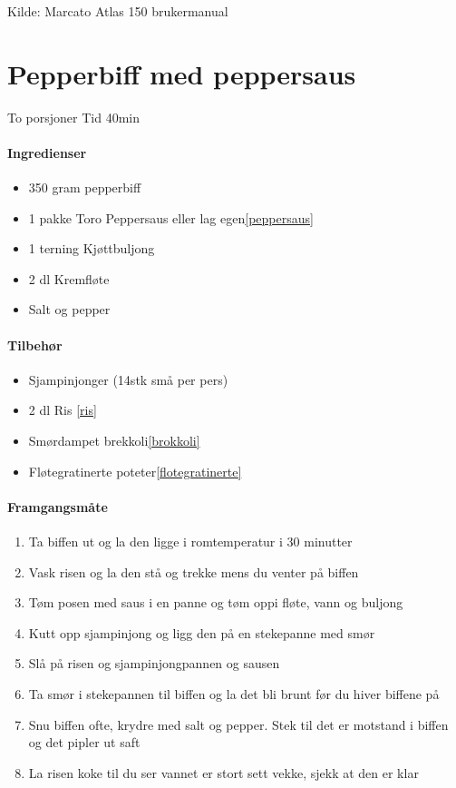 \documentclass[12pt,a4paper]{book}
\begin{document}
{Kilde: Marcato Atlas 150 brukermanual
\clearpage{}
\clearpage{}\section{﻿Pepperbiff med peppersaus}
To porsjoner
Tid 40min

\paragraph{Ingredienser}
\begin{itemize}[noitemsep]
	\item 350 gram  pepperbiff
	\item 1 pakke Toro Peppersaus eller lag egen\ref{peppersaus}
	\item 1 terning Kjøttbuljong
	\item 2 dl Kremfløte
	\item Salt og pepper
\end{itemize}

\paragraph{Tilbehør}
\begin{itemize}[noitemsep]
	\item Sjampinjonger (14stk små per pers)
	\item 2 dl Ris \ref{ris}
	\item Smørdampet brekkoli\ref{brokkoli}
	\item Fløtegratinerte poteter\ref{flotegratinerte}
\end{itemize}

\paragraph{Framgangsmåte}
\begin{enumerate}[noitemsep]
	\item Ta biffen ut og la den ligge i romtemperatur i 30 minutter
	\item Vask risen og la den stå og trekke mens du venter på biffen
	\item Tøm posen med saus i en panne og tøm oppi fløte, vann og buljong
	\item Kutt opp sjampinjong og ligg den på en stekepanne med smør
	\item Slå på risen og sjampinjongpannen og sausen
	\item Ta smør i stekepannen til biffen og la det bli brunt før du hiver biffene på
	\item Snu biffen ofte, krydre med salt og pepper. Stek til det er motstand i biffen og det pipler ut saft
	\item La risen koke til du ser vannet er stort sett vekke, sjekk at den er klar
\end{enumerate}

}
\end{document}
